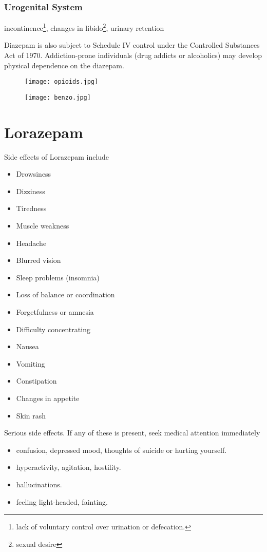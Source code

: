\subsubsection{Urogenital System}  incontinence\footnote{lack of voluntary control over urination or defecation.}, changes in libido\footnote{sexual desire}, urinary retention


Diazepam is also subject to Schedule IV control under the Controlled Substances Act of 1970. Addiction-prone individuals (drug addicts or alcoholics) may develop physical dependence on the diazepam.

\begin{figure}
\centering
\begin{minipage}{.5\textwidth}
  \centering
  \texttt{[image: opioids.jpg]}
  \label{fig:op}
\end{minipage}%
\begin{minipage}{.5\textwidth}
  \centering
  \texttt{[image: benzo.jpg]}
  \label{fig:bnz}
\end{minipage}
\end{figure}





\section{Lorazepam} 
Side effects of Lorazepam include
\begin{multicols}{2}
\begin{itemize}
\item Drowsiness
\item Dizziness
\item Tiredness
\item Muscle weakness
\item Headache
\item Blurred vision
\item Sleep problems (insomnia)
\item Loss of balance or coordination
\item Forgetfulness or amnesia
\item Difficulty concentrating
\item Nausea
\item Vomiting
\item Constipation
\item Changes in appetite
\item Skin rash
\end{itemize}
\end{multicols}
Serious side effects. If any of these is present, seek medical attention immediately
\begin{itemize}
\item confusion, depressed mood, thoughts of suicide or hurting yourself.
\item hyperactivity, agitation, hostility.
\item hallucinations.
\item feeling light-headed, fainting.
\end{itemize}